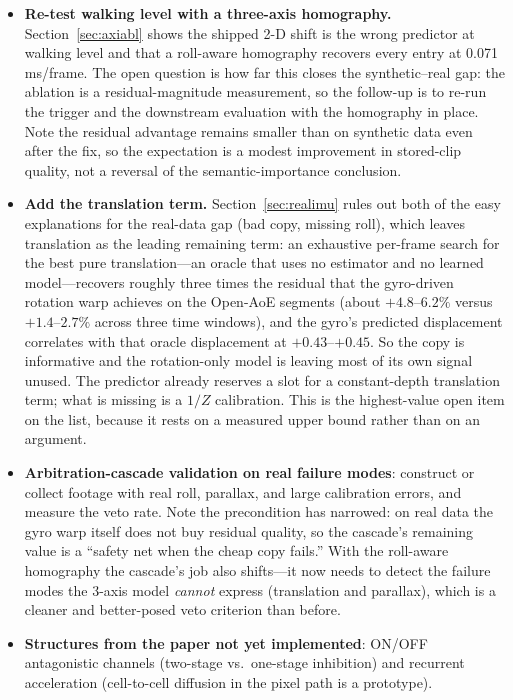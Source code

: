\documentclass[12pt,a4paper]{article}
\begin{document}
\begin{itemize}
  \item \textbf{Re-test walking level with a three-axis homography.} Section~\ref{sec:axiabl} shows the shipped 2-D shift is the wrong predictor at walking level and that a roll-aware homography recovers every entry at 0.071 ms/frame. The open question is how far this closes the synthetic--real gap: the ablation is a residual-magnitude measurement, so the follow-up is to re-run the trigger and the downstream evaluation with the homography in place. Note the residual advantage remains smaller than on synthetic data even after the fix, so the expectation is a modest improvement in stored-clip quality, not a reversal of the semantic-importance conclusion.
  \item \textbf{Add the translation term.} Section~\ref{sec:realimu} rules out both of the easy explanations for the real-data gap (bad copy, missing roll), which leaves translation as the leading remaining term: an exhaustive per-frame search for the best pure translation---an oracle that uses no estimator and no learned model---recovers roughly three times the residual that the gyro-driven rotation warp achieves on the Open-AoE segments (about $+4.8$--$6.2\%$ versus $+1.4$--$2.7\%$ across three time windows), and the gyro's predicted displacement correlates with that oracle displacement at $+0.43$--$+0.45$. So the copy is informative and the rotation-only model is leaving most of its own signal unused. The predictor already reserves a slot for a constant-depth translation term; what is missing is a $1/Z$ calibration. This is the highest-value open item on the list, because it rests on a measured upper bound rather than on an argument.
  \item \textbf{Arbitration-cascade validation on real failure modes}: construct or collect footage with real roll, parallax, and large calibration errors, and measure the veto rate. Note the precondition has narrowed: on real data the gyro warp itself does not buy residual quality, so the cascade's remaining value is a ``safety net when the cheap copy fails.'' With the roll-aware homography the cascade's job also shifts---it now needs to detect the failure modes the 3-axis model \emph{cannot} express (translation and parallax), which is a cleaner and better-posed veto criterion than before.
  \item \textbf{Structures from the paper not yet implemented}: ON/OFF antagonistic channels (two-stage vs.\ one-stage inhibition) and recurrent acceleration (cell-to-cell diffusion in the pixel path is a prototype).

\end{itemize}
\end{document}
